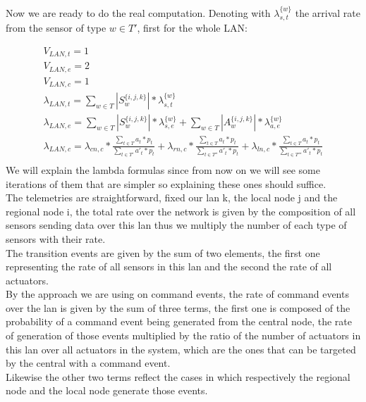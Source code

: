 \documentclass[11pt]{article}
\begin{document}
Now we are ready to do the real computation. Denoting with $\lambda^{\{w\}}_{s, t}$ the arrival rate from the sensor of type $w \in T'$, first for the whole LAN:

\begin{equation}
    \begin{array}{l}
        V_{LAN, t} = 1 \\
        V_{LAN, e} = 2 \\ %
        V_{LAN,c} = 1 \\
        \lambda_{LAN, t} = \sum\limits_{w \in T}{| S^{\{i,j,k\}}_{w} | * \lambda^{\{w\}}_{s, t}}  \\
        \lambda_{LAN, e} = \sum\limits_{w \in T}{| S^{\{i,j,k\}}_{w} | * \lambda^{\{w\}}_{s, e}} + \sum\limits_{w \in T}{| A^{\{i,j,k\}}_{w} | * \lambda^{\{w\}}_{a, e}}\\
		\lambda_{LAN, c} = \lambda_{cn, c} * \frac{\sum\limits_{t \in T}{a_{t} * p_{t}}}{\sum\limits_{t \in T'}{a'_{t} * p_{t}}} + \lambda_{rn, c} *\frac{\sum\limits_{t \in T}{a_{t} * p_{t}}}{\sum\limits_{t \in T''}{a'_{t} * p_{t}}}  + \lambda_{ln, c} * \frac{\sum\limits_{t \in T}{a_{t} * p_{t}}}{\sum\limits_{t \in T'''}{a'_{t} * p_{t}}}  \\\

    \end{array}
\end{equation}
We will explain the lambda formulas since from now on we will see some iterations of them that are simpler so explaining these ones should suffice.\\
The telemetries are straightforward, fixed our lan k, the local node j and the regional node i, the total rate over the network is given by the composition of all sensors sending data over this lan thus we multiply the number of each type of sensors with their rate.\\
The transition events are given by the sum of two elements, the first one representing the rate of all sensors in this lan and the second the rate of all actuators.\\
By the approach we are using on command events, the rate of command events over the lan is given by the sum of three terms, the first one is composed of the probability of a command event being generated from the central node, the rate of generation of those events multiplied by the ratio of the number of actuators in this lan over all actuators in the system, which are the ones that can be targeted by the central with a command event.\\
Likewise the other two terms reflect the cases in which respectively the regional node and the local node generate those events.\\
\end{document}
